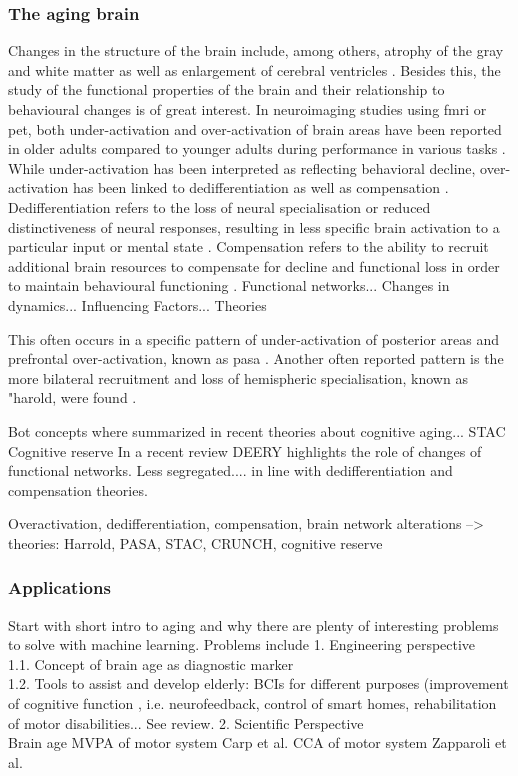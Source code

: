 \subsubsection{The aging brain}

Changes in the structure of the brain include, among others, atrophy of the gray and white matter as well as enlargement of cerebral ventricles \cite{Fjell2010}. Besides this, the study of the functional properties of the brain and their relationship to behavioural changes is of great interest. In neuroimaging studies using \gls{fmri} or \gls{pet}, both under-activation and over-activation of brain areas have been reported in older adults compared to younger adults during performance in various tasks \cite{Reuter-Lorenz2010}. While under-activation has been interpreted as reflecting behavioral decline, over-activation has been linked to dedifferentiation as well as compensation \cite{Grady2012}. Dedifferentiation refers to the loss of neural specialisation or reduced distinctiveness of neural responses, resulting in less specific brain activation to a particular input or mental state \cite{Festini2018}. Compensation refers to the ability to recruit additional brain resources to compensate for decline and functional loss in order to maintain behavioural functioning \cite{Reuter-Lorenz2010, Grady2012}. Functional networks... Changes in dynamics... Influencing Factors... Theories 

This often occurs in a specific pattern of under-activation of posterior areas and prefrontal over-activation, known as \gls{pasa} \cite{Davis2007}. Another often reported pattern is the more bilateral recruitment and loss of hemispheric specialisation, known as "\gls{harold}, were found \cite{Cabeza2002}.

Bot concepts where summarized in recent theories about cognitive aging... STAC 
Cognitive reserve  
In a recent review DEERY highlights the role of changes of functional networks. Less segregated.... in line with dedifferentiation and compensation theories. 
\cite{Deery2023}


Overactivation, dedifferentiation, compensation, brain network alterations --> theories:  Harrold, PASA, STAC, CRUNCH, cognitive reserve

\subsubsection{Applications}
Start with short intro to aging and why there are plenty of interesting problems to solve with machine learning. Problems include
1. Engineering perspective\\
1.1. Concept of brain age as diagnostic marker\\  
1.2. Tools to assist and develop elderly: BCIs for different purposes (improvement of cognitive function  , i.e. neurofeedback, control of smart homes, rehabilitation of motor disabilities... See review. 
2. Scientific Perspective\\
Brain age 
MVPA of motor system Carp et al. 
CCA of motor system Zapparoli et al.



